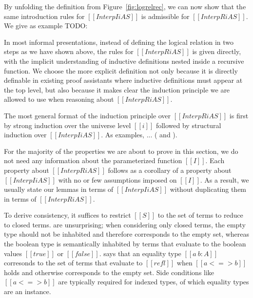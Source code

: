 \documentclass[acmsmall]{acmart}
\begin{document}
By unfolding the definition from Figure~\ref{fig:logrelrec}, we can
now show that the same introduction rules for $[[Interp I i A S]]$ is
admissible for $[[InterpR i A S]]$. We give as example TODO:

In most informal presentations, instead of defining the logical
relation in two steps as we have shown above, the rules for $[[InterpR
i A S]]$ is given directly, with the implicit understanding of
inductive definitions nested inside a recursive function. We choose
the more explicit definition not only because it is directly definable
in existing proof assistants where inductive definitions must appear
at the top level, but also because it makes clear the induction
principle we are allowed to use when reasoning about $[[InterpR i A
S]]$.

The most general format of the induction principle over $[[InterpR i A
S]]$ is first by strong induction over the universe level $[[i]]$
followed by structural induction over $[[Interp I i A S]]$. As
examples, ... ( and ).

For the majority of the properties we are about to prove in this section, we
do not need any information about the parameterized function $[[I]]$.
Each property about $[[InterpR i A S]]$ follows as a corollary of
a property about $[[Interp I i A S]]$ with no or few assumptions imposed on
$[[I]]$. As a result, we usually state our lemmas in terms of
$[[Interp I i A S]]$ without duplicating them in terms of $[[InterpR i
A S]]$.

To derive consistency, it suffices to restrict $[[S]]$ to the set of
terms to reduce to closed terms.  are
unsurprising; when considering only closed terms, the empty type
should not be inhabited and therefore corresponds to the empty set,
whereas the boolean type is semantically inhabited by terms that
evaluate to the boolean values $[[true]]$ or $[[false]]$. 
says that an equality type $[[a ~ b : A]]$ corresonds to the
set of terms that evaluate to $[[refl]]$ when $[[a <=> b]]$ holds and
otherwise corresponds to the empty set. Side conditions like $[[a <=>
b]]$ are typically required for indexed types, of which equality types
are an instance.
\end{document}
